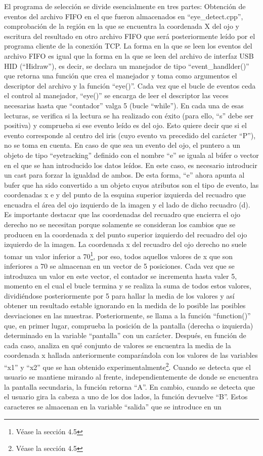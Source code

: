 El programa de selección se divide esencialmente en tres partes: Obtención de eventos del archivo FIFO en el que fueron almacenados en ``eye\_detect.cpp'', comprobación de la región en la que se encuentra la coordenada X del ojo y escritura del resultado en otro archivo FIFO que será posteriormente leído por el programa cliente de la conexión TCP. La forma en la que se leen los eventos del archivo FIFO es igual que la forma en la que se leen del archivo de interfaz USB HID (``Hidraw''), es decir, se declara un manejador de tipo ``event\_handlder()''  que retorna una función que crea el manejador y toma como argumentos el descriptor del archivo y la función ``eye()''. Cada vez que el bucle de eventos ceda el control al manejador, ``eye()'' se encarga de leer el descriptor las veces necesarias hasta que ``contador'' valga 5 (bucle ``while''). En cada una de esas lecturas, se verifica si la lectura se ha realizado con éxito (para ello, ``s'' debe ser positiva) y comprueba si ese evento leído es del ojo. Esto quiere decir que si el evento corresponde al centro del iris (cuyo evento va precedido del carácter ``P''), no se toma en cuenta. En caso de que sea un evento del ojo, el puntero a un objeto de tipo ``eyetracking'' definido con el nombre ``e'' se iguala al búfer o vector en el que se han introducido los datos leídos. En este caso, es necesario introducir un cast para forzar la igualdad de ambos. De esta forma, ``e'' ahora apunta al bufer que ha sido convertido a un objeto cuyos atributos son el tipo de evento, las coordenadas x e y del punto de la esquina superior izquierda del recuadro que encuadra el área del ojo izquierdo de la imagen y el lado de dicho recuadro (d). Es importante destacar que las coordenadas del recuadro que encierra el ojo derecho no se necesitan porque solamente se consideran los cambios que se producen en la coordenada x del punto superior izquierdo del recuadro del ojo izquierdo de la imagen. La coordenada x del recuadro del ojo derecho no suele tomar un valor inferior a 70\footnote{Véase la sección 4.5}, por eso, todos aquellos valores de x que son inferiores a 70 se almacenan en un vector de 5 posiciones. Cada vez que se introduzca un valor en este vector, el contador se incrementa hasta valer 5, momento en el cual el bucle termina y se realiza la suma de todos estos valores, dividiéndose posteriormente por 5 para hallar la media de los valores y así obtener un resultado estable ignorando en la medida de lo posible las posibles desviaciones en las muestras. Posteriormente, se llama a la función ``function()'' que, en primer lugar, comprueba la posición de la pantalla (derecha o izquierda) determinado en la variable ``pantalla'' con un carácter. Después, en función de cada caso, analiza en qué conjunto de valores se encuentra la media de la coordenada x hallada anteriormente comparándola con los valores de las variables ``x1'' y ``x2'' que se han obtenido experimentalmente\footnote{Véase la sección 4.5}. Cuando se detecta que el usuario se mantiene mirando al frente, independientemente de donde se encuentra la pantalla secundaria, la función retorna ``A''. En cambio, cuando se detecta que el usuario gira la cabeza a uno de los dos lados, la función devuelve ``B''. Estos caracteres se almacenan en la variable ``salida'' que se introduce en un 